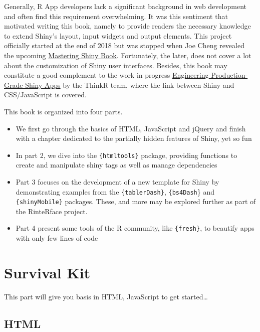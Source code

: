 \documentclass[]{book}
\providecommand{\tightlist}{%
  \setlength{\itemsep}{0pt}\setlength{\parskip}{0pt}}
\begin{document}
Generally, R App developers lack a significant background in web development and often find this requirement overwhelming. It was this sentiment that motivated writing this book, namely to provide readers the necessary knowledge to extend Shiny's layout, input widgets and output elements. This project officially started at the end of 2018 but was stopped when Joe Cheng revealed the upcoming \href{https://mastering-shiny.org}{Mastering Shiny Book}. Fortunately, the later, does not cover a lot about the customization of Shiny user interfaces. Besides, this book may constitute a good complement to the work in progress \href{https://engineering-shiny.org}{Engineering Production-Grade Shiny Apps} by the ThinkR team, where the link between Shiny and CSS/JavaScript is covered.

This book is organized into four parts.

\begin{itemize}
\tightlist
\item
  We first go through the basics of HTML, JavaScript and jQuery and finish with a chapter dedicated to the partially hidden features of Shiny, yet so fun
\item
  In part 2, we dive into the \texttt{\{htmltools\}} package, providing functions to create and manipulate shiny tags as well as manage dependencies
\item
  Part 3 focuses on the development of a new template for Shiny by demonstrating examples from the \texttt{\{tablerDash\}}, \texttt{\{bs4Dash}\} and \texttt{\{shinyMobile\}} packages. These, and more may be explored further as part of the RinteRface project.
\item
  Part 4 present some tools of the R community, like \texttt{\{fresh\}}, to beautify apps with only few lines of code
\end{itemize}

\hypertarget{part-survival-kit}{%
\part*{Survival Kit}\label{part-survival-kit}}

This part will give you basis in HTML, JavaScript to get started\ldots{}

\hypertarget{survival-kit-html}{%
\chapter{HTML}\label{survival-kit-html}}
\end{document}
